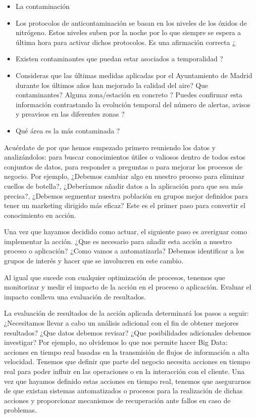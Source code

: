 \begin{itemize}
	\item La contaminación
	\item Los protocolos de anticontaminación se basan en los niveles de los óxidos de nitrógeno. Estos niveles suben por la noche por lo que siempre se espera a última hora para activar dichos protocolos. Es una afirmación correcta ¿
	
	\item Existen contaminantes que puedan estar asociados a temporalidad ?
	
	\item Consideras que las últimas medidas aplicadas por el Ayuntamiento de Madrid durante los últimos años han mejorado la calidad del aire? Que contaminantes? Alguna zona/estación en concreto ? Puedes confirmar esta información contrastando la evolución temporal del número de alertas, avisos y preavisos en las diferentes zonas ?
	
	\item Qué área es la más contaminada ?
	
\end{itemize}



 Acuérdate de por que hemos empezado primero reuniendo los datos y analizándolos: para buscar conocimientos útiles o valiosos dentro de todos estos conjuntos de datos, para responder a preguntas o para mejorar los procesos de negocio. Por ejemplo, ¿Debemos cambiar algo en nuestro proceso para eliminar cuellos de botella?, ¿Deberíamos añadir datos a la aplicación para que sea más precisa?, ¿Debemos segmentar nuestra población en grupos mejor definidos para tener un marketing dirigido más eficaz? Este es el primer paso para convertir el conocimiento en acción.

Una vez que hayamos decidido como actuar, el siguiente paso es averiguar como implementar la acción. ¿Que es necesario para añadir esta acción a nuestro proceso o aplicación? ¿Como vamos a automatizarla? Debemos identificar a los grupos de interés y hacer que se involucren en este cambio.

Al igual que sucede con cualquier optimización de procesos, tenemos que monitorizar y medir el impacto de la acción en el proceso o aplicación. Evaluar el impacto conlleva una evaluación de resultados.

La evaluación de resultados de la acción aplicada determinará los pasos a seguir: ¿Necesitamos llevar a cabo un análisis adicional con el fin de obtener mejores resultados? ¿Que datos debemos revisar? ¿Que posibilidades adicionales debemos investigar? Por ejemplo, no olvidemos lo que nos permite hacer Big Data: acciones en tiempo real basadas en la transmisión de flujos de información a alta velocidad. Tenemos que definir que parte del negocio necesita acciones en tiempo real para poder influir en las operaciones o en la interacción con el cliente. Una vez que hayamos definido estas acciones en tiempo real, tenemos que asegurarnos de que existan sistemas automatizados o procesos para la realización de dichas acciones y proporcionar mecanismos de recuperación ante fallos en caso de problemas.